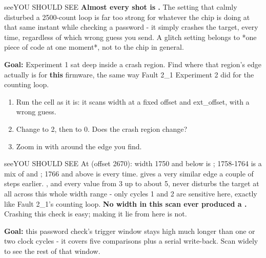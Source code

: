 \documentclass[11pt,letterpaper]{article}
\begin{document}
\begin{guidecallout}{see}{YOU SHOULD SEE}
\textbf{Almost every shot is .} The setting that calmly disturbed a 2500-count loop is far too strong for
whatever the chip is doing at that same instant while checking a password - it simply crashes the target, every time,
regardless of which wrong guess you send. A glitch setting belongs to *one piece of code at one moment*, not to the
chip in general.
\end{guidecallout}


\textbf{Goal:} Experiment 1 sat deep inside a crash region. Find where that region's edge actually is for
\textbf{this} firmware, the same way Fault 2\_1 Experiment 2 did for the counting loop.

\begin{enumerate}[label=\arabic*.,leftmargin=1.8em,itemsep=2pt,topsep=2pt,parsep=0pt,start=1]
\item Run the cell as it is: it scans width at a fixed offset and ext\_offset, with a wrong guess.
\item Change  to 2, then to 0. Does the crash region change?
\item Zoom in with  around the edge you find.
\end{enumerate}

\begin{guidecallout}{see}{YOU SHOULD SEE}
At  (offset 2670): width 1750 and below is ; 1758-1764 is a mix of  and
; 1766 and above is  every time.  gives a very similar edge a couple of
steps earlier. , and every value from 3 up to about 5, never disturbs the target at all across
this whole width range - only cycles 1 and 2 are sensitive here, exactly like Fault 2\_1's counting loop. \textbf{No
width in this scan ever produced a .} Crashing this check is easy; making it lie from here is not.
\end{guidecallout}


\textbf{Goal:} this password check's trigger window stays high much longer than one or two clock cycles - it covers
five comparisons plus a serial write-back. Scan  widely to see the rest of that window.
\end{document}
